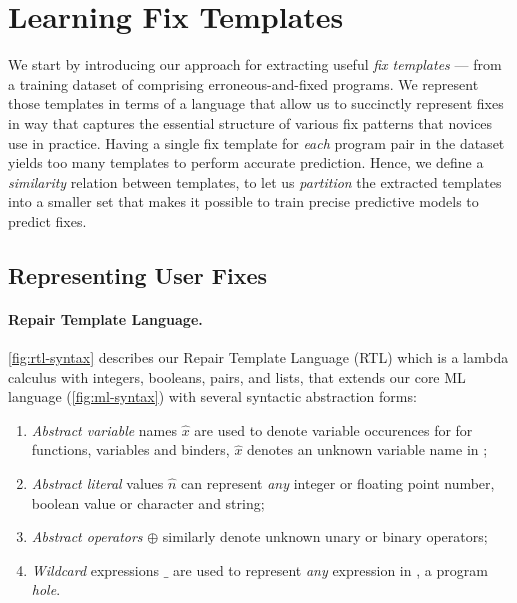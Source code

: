 \section{Learning Fix Templates}
\label{sec:templ-cluster}

We start by introducing our approach for extracting 
useful \emph{fix templates} --- from a training dataset 
of comprising erroneous-and-fixed programs. 
%
We represent those templates in terms of a language 
that allow us to succinctly represent fixes in way 
that captures the essential structure of various fix 
patterns that novices use in practice.
%
Having a single fix template for \emph{each} program 
pair in the dataset yields too many templates to perform 
accurate prediction. 
%
Hence, we define a \emph{similarity} relation between 
templates, to let us \emph{partition} the extracted 
templates into a smaller set that makes it possible 
to train precise predictive models to predict fixes.



\subsection{Representing User Fixes}
\label{sec:templ-cluster:lang}

\paragraph{Repair Template Language.}
\autoref{fig:rtl-syntax} describes our Repair Template Language (RTL)
which is a lambda calculus with integers, booleans, pairs,
and lists, that extends our core ML language \lang (\autoref{fig:ml-syntax})
with several syntactic abstraction forms:

\begin{enumerate}
    \item \emph{Abstract variable} names $\hat{x}$  are used to denote variable 
    occurences for for functions, variables and binders, \ie $\hat{x}$ denotes 
    an unknown variable name in \repairLang;

    \item \emph{Abstract literal} values $\hat{n}$ can represent \emph{any} 
    integer or floating point number, boolean value or character and string;

    \item \emph{Abstract operators} $\oplus$ similarly denote unknown unary or binary 
    operators; 

    \item \emph{Wildcard} expressions $\_$ are used to represent \emph{any} 
    expression in \repairLang, \ie a program \emph{hole}.
\end{enumerate}

